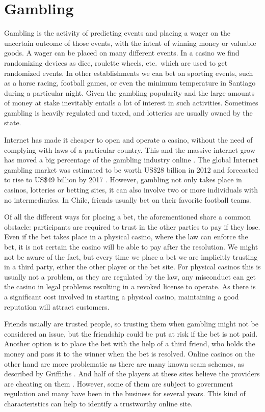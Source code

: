 \section{Gambling} \label{gambling}
Gambling is the activity of predicting events and placing a wager on the
  uncertain outcome of those events, with the intent of winning money or
  valuable goods.
A wager can be placed on many different events. In a casino we find randomizing
  devices as dice, roulette wheels, etc.\ which are used to get randomized
  events. In other establishments we can bet on sporting events, such as a horse
  racing, football games,  or even the minimum temperature in Santiago during a
  particular night.
Given the gambling popularity and the large amounts of money at stake inevitably
  entails a lot of interest in such activities.
Sometimes gambling is heavily regulated and taxed, and lotteries are usually
  owned by the state.

Internet has made it cheaper to open and operate a casino, without the need of
  complying with laws of a particular country.
This and the massive internet grow has moved a big percentage of the gambling
  industry online \cite{shelat2002makes,griffiths2008internet}.
The global Internet gambling market was estimated to be worth US\$28 billion in
  2012 and forecasted to rise to US\$49 billion by 2017%
  \cite{gainsbury2015risky}.
However, gambling not only takes place in casinos, lotteries or betting sites,
  it can also involve two or more individuals with no intermediaries.
In Chile, friends usually bet on their favorite football teams.

Of all the different ways for placing a bet, the aforementioned share a common
  obstacle: participants are required to trust in the other parties to pay if
  they lose.
Even if the bet takes place in a physical casino, where the law can enforce
  the bet, it is not certain the casino will be able to pay after the
  resolution.
We might not be aware of the fact, but every time we place a bet we are
  implicitly trusting in a third party, either the other player or the bet
  site. For physical casinos this is usually not a problem, as they are
  regulated by the law, any misconduct can get the casino in legal problems
  resulting in a revoked license to operate.
As there is a significant cost involved in starting a physical casino,
  maintaining a good reputation will attract customers.

Friends usually are trusted people, so trusting them when gambling might not
  be considered an issue, but the friendship could be put at risk if the bet
  is not paid. Another option is to place the bet with the help  of a third
  friend, who holds the money and pass it to the winner when the bet is
  resolved.
Online casinos on the other hand are more problematic as there are many known
  scam schemes, as described by Griffiths \cite{griffiths2010crime}. And
  half of the players at these sites believe the providers are cheating on
  them \cite{mcmullan2010online}. However, some of them are subject to
  government regulation and many have been in the business for several years.
This kind of characteristics can help to identify a trustworthy online site.

